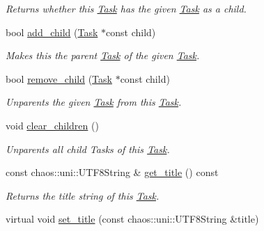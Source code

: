 \begin{DoxyCompactItemize}
\begin{DoxyCompactList}\small\item\em Returns whether this \hyperlink{classsigma_1_1core_1_1tasks_1_1_task}{Task} has the given \hyperlink{classsigma_1_1core_1_1tasks_1_1_task}{Task} as a child. \end{DoxyCompactList}\item 
bool \hyperlink{classsigma_1_1core_1_1tasks_1_1_task_abac88c4ddaf54ae20aab497e95023f9e}{add\+\_\+child} (\hyperlink{classsigma_1_1core_1_1tasks_1_1_task}{Task} $\ast$const child)
\begin{DoxyCompactList}\small\item\em Makes this the parent \hyperlink{classsigma_1_1core_1_1tasks_1_1_task}{Task} of the given \hyperlink{classsigma_1_1core_1_1tasks_1_1_task}{Task}. \end{DoxyCompactList}\item 
bool \hyperlink{classsigma_1_1core_1_1tasks_1_1_task_a9df7e8a262b51b440cc6a45dbe219810}{remove\+\_\+child} (\hyperlink{classsigma_1_1core_1_1tasks_1_1_task}{Task} $\ast$const child)
\begin{DoxyCompactList}\small\item\em Unparents the given \hyperlink{classsigma_1_1core_1_1tasks_1_1_task}{Task} from this \hyperlink{classsigma_1_1core_1_1tasks_1_1_task}{Task}. \end{DoxyCompactList}\item 
void \hyperlink{classsigma_1_1core_1_1tasks_1_1_task_acb08acc571c5e0678d27d52a18a7db5e}{clear\+\_\+children} ()
\begin{DoxyCompactList}\small\item\em Unparents all child Tasks of this \hyperlink{classsigma_1_1core_1_1tasks_1_1_task}{Task}. \end{DoxyCompactList}\item 
\hypertarget{classsigma_1_1core_1_1tasks_1_1_task_a8fd41c73909654ee57670b45c273a65b}{}const chaos\+::uni\+::\+U\+T\+F8\+String \& \hyperlink{classsigma_1_1core_1_1tasks_1_1_task_a8fd41c73909654ee57670b45c273a65b}{get\+\_\+title} () const \label{classsigma_1_1core_1_1tasks_1_1_task_a8fd41c73909654ee57670b45c273a65b}

\begin{DoxyCompactList}\small\item\em Returns the title string of this \hyperlink{classsigma_1_1core_1_1tasks_1_1_task}{Task}. \end{DoxyCompactList}\item 
\hypertarget{classsigma_1_1core_1_1tasks_1_1_task_ab65a709ed6a7e804fea2b0ef763313c9}{}virtual void \hyperlink{classsigma_1_1core_1_1tasks_1_1_task_ab65a709ed6a7e804fea2b0ef763313c9}{set\+\_\+title} (const chaos\+::uni\+::\+U\+T\+F8\+String \&title)\label{classsigma_1_1core_1_1tasks_1_1_task_ab65a709ed6a7e804fea2b0ef763313c9}


\end{DoxyCompactItemize}
